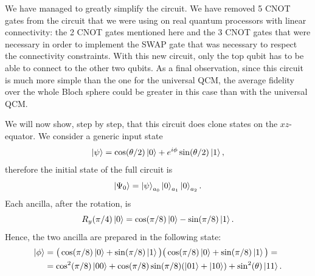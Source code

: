 We have managed to greatly simplify the circuit. We have removed 5 CNOT gates from the circuit that we were using on real quantum processors with linear connectivity: the 2 CNOT gates mentioned here and the 3 CNOT gates that were necessary in order to implement the SWAP gate that was necessary to respect the connectivity constraints.
With this new circuit, only the top qubit has to be able to connect to the other two qubits.
As a final observation, since this circuit is much more simple than the one for the universal QCM, the average fidelity over the whole Bloch sphere could be greater in this case than with the universal QCM.

We will now show, step by step, that this circuit does clone states on the $xz$-equator.
We consider a generic input state
\[
    \ket{\psi}=\cos(\theta/2)\ket{0}+e^{i\phi}\sin(\theta/2)\ket{1},
\]
therefore the initial state of the full circuit is
\[
    \ket{\Psi_0}=\ket{\psi}_{a_0}\ket{0}_{a_1}\ket{0}_{a_2}.
\]
Each ancilla, after the rotation, is
\[
    R_y(\pi/4)\ket{0}=\cos(\pi/8)\ket{0}-\sin(\pi/8)\ket{1}.
\]
Hence, the two ancilla are prepared in the following state:
\[
    \begin{split}
    \ket{\phi}&=\big(\cos(\pi/8)\ket{0}+\sin(\pi/8)\ket{1}\big)\big(\cos(\pi/8)\ket{0}+\sin(\pi/8)\ket{1}\big)=\\
    &=\cos^2(\pi/8)\ket{00}+\cos(\pi/8)\sin(\pi/8)(\ket{01}+\ket{10})+\sin^2(\theta)\ket{11}.
    \end{split}
\]

